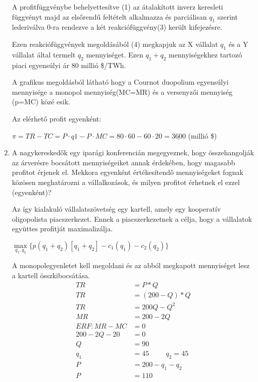 \documentclass[10pt,a4paper]{article}
\begin{document}
\begin{enumerate}[label=(\alph*)]
A profitfüggvénybe  behelyettesítve (1) az átalakított inverz keresleti függvényt majd az elsőrendű feltételt alkalmazza és parciálisan $q_1$ szerint lederiválva 0-ra rendezve a két reakciófüggvény(3) került kifejezésre.

Ezen reakciófüggvények megoldásából (4) megkapjuk az X vállalat $q_1$ és a Y vállalat által termelt $q_2$ mennyiséget. Ezen $q_1+q_2$ mennyiségekhez tartozó piaci egyensúlyi ár 80 millió \$/TWh.


A grafikus megoldásból látható hogy a Cournot duopolium egyensúlyi mennyisége a monopol mennyiség(MC=MR) és a versenyzői mennyiség (p=MC) közé esik.

Az elérhető profit egyenként:

$\pi=TR-TC = P \cdot q1 - P \cdot MC = 80 \cdot 60 - 60 \cdot 20 = \underline{3600}$ (millió \$)

\item A nagykereskedők egy iparági konferencián megegyeznek, hogy összehangolják az árverésre bocsátott mennyiségeiket annak érdekében, hogy magasabb profitot érjenek el.
Mekkora egyenként értékesítendő mennyiségeket fognak közösen meghatározni a vállalkozások, és milyen profitot érhetnek el ezzel (egyenként)?

Az így kialakuló vállalatszövetség egy kartell, amely egy kooperatív oligopolista piacszerkezet. Ennek a piacszerkezetnek a célja, hogy a vállalatok együttes profitját maximalizálja. 

$\max\limits_{q_1, q_2} \{p(q_1+q_2)[q_1+q_2] -c_1(q_1) -c_2(q_2)\}$

A monopolegyenletet kell megoldani és az abból megkapott mennyiséget lesz a kartell összkibocsátása.
\begin{align}
TR &= P*Q \nonumber\\
TR &= (200-Q)*Q \nonumber\\
TR &= 200Q-Q^2 \nonumber\\
MR &= 200-2Q \nonumber\\
ERF: MR-MC &= 0 \nonumber\\
200-2Q -20 &= 0 \nonumber\\
Q &= 90 \nonumber\\
q_1 &= 45 \hspace{1cm} q_2 = 45 \nonumber\\
P &= 200-q_1-q_2 \nonumber\\
P &= 110  \nonumber
\end{align}


\end{enumerate}
\end{document}
